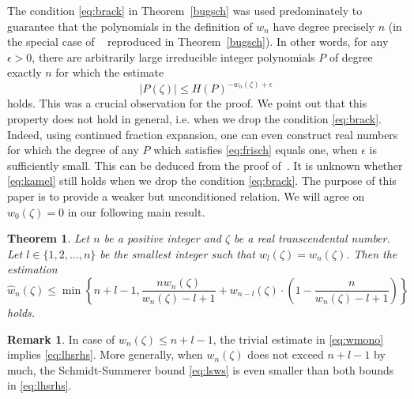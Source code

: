 \documentclass[12pt]{amsart}
\newtheorem{theorem}{Theorem}[section]
\theoremstyle{definition}
\newtheorem{remark}{Remark}
\begin{document}
The condition \eqref{eq:brack} in Theorem~\ref{bugsch} was used predominately to guarantee
that the polynomials in the definition of $w_{n}$ have degree precisely $n$ (in the
special case of ~\cite[Theorem~2.2]{buschl} reproduced 
in Theorem~\ref{bugsch}). In other words,
for any $\epsilon>0$, there are arbitrarily large irreducible integer polynomials 
$P$ of degree exactly $n$ for which the estimate
\begin{equation} \label{eq:frisch}
\vert P(\zeta)\vert \leq H(P)^{-w_{n}(\zeta)+\epsilon}
\end{equation}
holds. This was a crucial observation for the proof.
We point out that this property does not hold in general, i.e. when we drop the condition \eqref{eq:brack}. 
Indeed, using continued fraction expansion, one can even construct real numbers for which
the degree of any $P$ which satisfies \eqref{eq:frisch} equals one, when $\epsilon$ is sufficiently small.
This can be deduced from the proof of~\cite[Corollary~1]{bug2010}. It is unknown whether \eqref{eq:kamel} still holds
when we drop the condition \eqref{eq:brack}.
The purpose of
this paper is to provide a weaker but unconditioned relation.
 We will agree on $w_{0}(\zeta)=0$ in our following main result. 

\begin{theorem} \label{nn}
Let $n$ be a positive integer and $\zeta$ be a real transcendental number. Let $l\in\{1,2,\ldots,n\}$ be the smallest integer such 
that $w_{l}(\zeta)= w_{n}(\zeta)$.
Then the estimation
\begin{equation} \label{eq:lhsrhs}
\widehat{w}_{n}(\zeta)\leq \min \left\{n+l-1, 
\frac{nw_{n}(\zeta)}{w_{n}(\zeta)-l+1}+w_{n-l}(\zeta)\cdot \left(1-\frac{n}{w_{n}(\zeta)-l+1}\right)\right\}
\end{equation}
holds.
\end{theorem}

\begin{remark} \label{rehmark}
In case of $w_{n}(\zeta)\leq n+l-1$, the trivial estimate in \eqref{eq:wmono} implies \eqref{eq:lhsrhs}.
More generally, when $w_{n}(\zeta)$ does not exceed
$n+l-1$ by much, the Schmidt-Summerer bound \eqref{eq:lsws} is even smaller than both bounds in \eqref{eq:lhsrhs}.
\end{remark}
\end{document}

